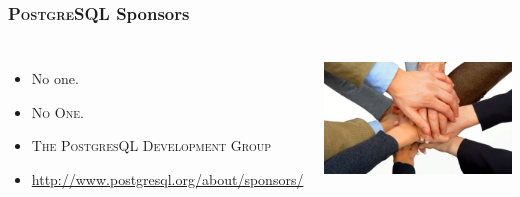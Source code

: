 \documentclass{beamer}
\begin{document}
\begin{frame}[fragile]
  \frametitle{\textsc{PostgreSQL} Sponsors}

  \vfill

\begin{columns}[c]

  \begin{itemize}
  \item No one.
  \item {\Large \textsc{No One.}}
  \item \textsc{The PostgresQL Development Group}
  \item \url{http://www.postgresql.org/about/sponsors/}
  \end{itemize}

\begin{center}
  \includegraphics[height=9em]{corporate_sponsorship.jpg}
\end{center}
\end{columns}
\end{frame}
\end{document}
